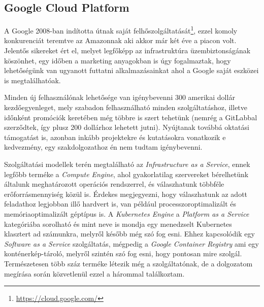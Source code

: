 \subsection{Google Cloud Platform}
A Google 2008-ban indította útnak saját felhőszolgáltatását\footnote{\url{https://cloud.google.com/}}, ezzel komoly konkurenciát teremtve az Amazonnak aki akkor már két éve a piacon volt. Jelentős sikereket ért el, melyet legfőképp az infrastruktúra üzembiztonságának köszönhet, egy időben a marketing anyagokban is úgy fogalmaztak, hogy lehetőségünk van ugyanott futtatni alkalmazásainkat ahol a Google saját eszközei is megtalálhatóak.

Minden új felhasználónak lehetősége van igénybevenni 300 amerikai dollár kezdőegyenleget, mely szabadon felhasználható minden szolgáltatáshoz, illetve időnként promóciók keretében még többre is szert tehetünk (nemrég a GitLabbal szerződtek, így plusz 200 dollárhoz lehetett jutni). Nyújtanak továbbá oktatási támogatást is, azonban inkább projektekre és kutatásokra vonatkozik e kedvezmény, egy szakdolgozathoz én nem tudtam igénybevenni.

Szolgáltatási modellek terén megtalálható az \textit{Infrastructure as a Service}, ennek legfőbb terméke a \textit{Compute Engine}, ahol gyakorlatilag szervereket bérelhetünk általunk meghatározott operációs rendszerrel, és válaszhatunk többféle erőforrásmennyiség közül is. Érdekes megjegyezni, hogy válaszhatunk az adott feladathoz legjobban illő hardvert is, van például processzoroptimalizált és memóriaoptimalizált géptípus is. A \textit{Kubernetes Engine} a \textit{Platform as a Service} kategóriába sorolható és mint neve is mondja egy menedzselt Kubernetes klasztert ad számunkra, melyről később még szó fog esni. Ehhez kapcsolódik egy \textit{Software as a Service} szolgáltatás, mégpedig a \textit{Google Container Registry} ami egy konténerkép-tároló, melyről szintén szó fog esni, hogy pontosan mire szolgál. Természetesen több száz terméke létezik még a szolgáltatónak, de a dolgozatom megírása során közvetlenül ezzel a hárommal találkoztam.

